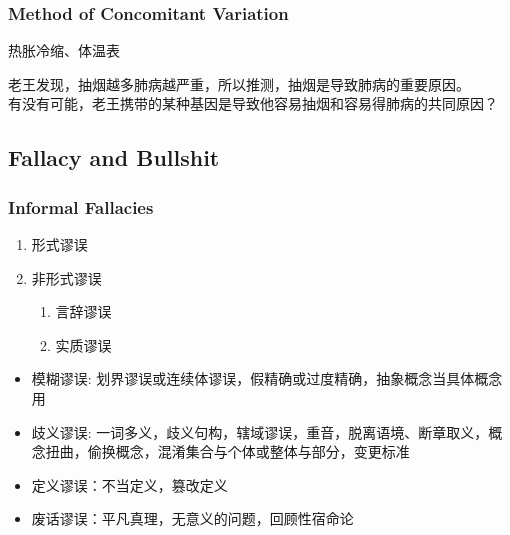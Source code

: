 \documentclass[UTF8,11pt,colorlinks,compress,openany]{beamer}%
\begin{document}
\begin{frame}\frametitle{Method of Concomitant Variation}
	\begin{prooftree}
		\noLine
		\noLine
		\alwaysSingleLine
	\end{prooftree}
	\begin{block}{}
		热胀冷缩、体温表
	\end{block}
	\begin{block}{}
		老王发现，抽烟越多肺病越严重，所以推测，抽烟是导致肺病的重要原因。\\
		有没有可能，老王携带的某种基因是导致他容易抽烟和容易得肺病的共同原因？
	\end{block}
\end{frame}

\subsection{Fallacy and Bullshit}

\begin{frame}\frametitle{Informal Fallacies}
\begin{enumerate}[i]
	\item 形式谬误
	\item 非形式谬误
		\begin{enumerate}[1.]
			\item 言辞谬误
			\item 实质谬误
		\end{enumerate}
\end{enumerate}
\begin{itemize}
	\item 模糊谬误: 划界谬误或连续体谬误，假精确或过度精确，抽象概念当具体概念用
	\item 歧义谬误: 一词多义，歧义句构，辖域谬误，重音，脱离语境、断章取义，概念扭曲，偷换概念，混淆集合与个体或整体与部分，变更标准
	\item 定义谬误：不当定义，篡改定义
	\item 废话谬误：平凡真理，无意义的问题，回顾性宿命论
\end{itemize}
\end{frame}
\end{document}
